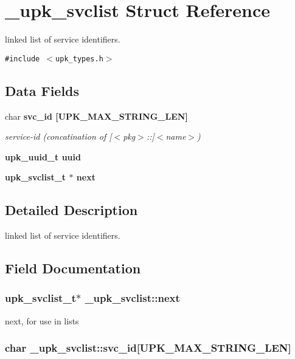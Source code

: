 \section{\_\-upk\_\-svclist Struct Reference}
\label{struct__upk__svclist}
linked list of service identifiers.  


{\tt \#include $<$upk\_\-types.h$>$}

\subsection*{Data Fields}
\begin{CompactItemize}
\item 
char \bf{svc\_\-id} [UPK\_\-MAX\_\-STRING\_\-LEN]
\begin{CompactList}\small\item\em service-id (concatination of [$<$pkg$>$::]$<$name$>$) \item\end{CompactList}\item 
\bf{upk\_\-uuid\_\-t} \bf{uuid}
\item 
\bf{upk\_\-svclist\_\-t} $\ast$ \bf{next}
\end{CompactItemize}


\subsection{Detailed Description}
linked list of service identifiers. 



\subsection{Field Documentation}
\subsubsection{\setlength{\rightskip}{0pt plus 5cm}\bf{upk\_\-svclist\_\-t}$\ast$ \bf{\_\-upk\_\-svclist::next}}\label{struct__upk__svclist_1b2a260a3e8f9786439be131e0337bad}


next, for use in lists 
\subsubsection{\setlength{\rightskip}{0pt plus 5cm}char \bf{\_\-upk\_\-svclist::svc\_\-id}[UPK\_\-MAX\_\-STRING\_\-LEN]}\label{struct__upk__svclist_d217b62bf34bfc43da8c848a50430088}


